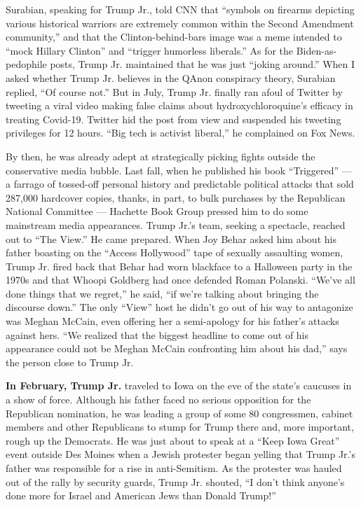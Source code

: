 Surabian, speaking for Trump Jr., told CNN that ``symbols on firearms
depicting various historical warriors are extremely common within the
Second Amendment community,'' and that the Clinton-behind-bars image was
a meme intended to ``mock Hillary Clinton'' and ``trigger humorless
liberals.'' As for the Biden-as-pedophile posts, Trump Jr. maintained
that he was just ``joking around.'' When I asked whether Trump Jr.
believes in the QAnon conspiracy theory, Surabian replied, ``Of course
not.'' But in July, Trump Jr. finally ran afoul of Twitter by tweeting a
viral video making false claims about hydroxychloroquine's efficacy in
treating Covid-19. Twitter hid the post from view and suspended his
tweeting privileges for 12 hours. ``Big tech is activist liberal,'' he
complained on Fox News.

By then, he was already adept at strategically picking fights outside
the conservative media bubble. Last fall, when he published his book
``Triggered'' --- a farrago of tossed-off personal history and
predictable political attacks that sold 287,000 hardcover copies,
thanks, in part, to bulk purchases by the Republican National Committee
--- Hachette Book Group pressed him to do some mainstream media
appearances. Trump Jr.'s team, seeking a spectacle, reached out to ``The
View.'' He came prepared. When Joy Behar asked him about his father
boasting on the ``Access Hollywood'' tape of sexually assaulting women,
Trump Jr. fired back that Behar had worn blackface to a Halloween party
in the 1970s and that Whoopi Goldberg had once defended Roman Polanski.
``We've all done things that we regret,'' he said, ``if we're talking
about bringing the discourse down.'' The only ``View'' host he didn't go
out of his way to antagonize was Meghan McCain, even offering her a
semi-apology for his father's attacks against hers. ``We realized that
the biggest headline to come out of his appearance could not be Meghan
McCain confronting him about his dad,'' says the person close to Trump
Jr.

\textbf{In February, Trump Jr.} traveled to Iowa on the eve of the
state's caucuses in a show of force. Although his father faced no
serious opposition for the Republican nomination, he was leading a group
of some 80 congressmen, cabinet members and other Republicans to stump
for Trump there and, more important, rough up the Democrats. He was just
about to speak at a ``Keep Iowa Great'' event outside Des Moines when a
Jewish protester began yelling that Trump Jr.'s father was responsible
for a rise in anti-Semitism. As the protester was hauled out of the
rally by security guards, Trump Jr. shouted, ``I don't think anyone's
done more for Israel and American Jews than Donald Trump!''


